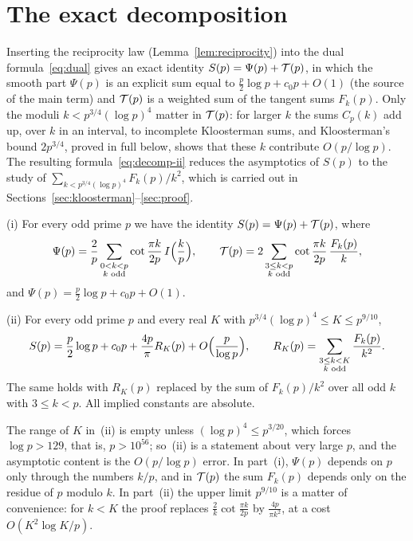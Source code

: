 \section{The exact decomposition}\label{sec:decomposition}

Inserting the reciprocity law (Lemma~\ref{lem:reciprocity}) into the dual formula~\eqref{eq:dual} gives an exact identity $S(p)=\Psi(p)+\mathcal{T}(p)$, in which the smooth part $\Psi(p)$ is an explicit sum equal to $\frac p2\log p+c_0p+O(1)$ (the source of the main term) and $\mathcal{T}(p)$ is a weighted sum of the tangent sums $F_k(p)$. Only the moduli $k<p^{3/4}(\log p)^4$ matter in $\mathcal{T}(p)$: for larger $k$ the sums $C_p(k)$ add up, over $k$ in an interval, to incomplete Kloosterman sums, and Kloosterman's bound $2p^{3/4}$, proved in full below, shows that these $k$ contribute $O(p/\log p)$. The resulting formula~\eqref{eq:decomp-ii} reduces the asymptotics of $S(p)$ to the study of $\sum_{k<p^{3/4}(\log p)^4}F_k(p)/k^2$, which is carried out in Sections~\ref{sec:kloosterman}--\ref{sec:proof}.

\begin{theorem}\label{thm:decomp}
\textup{(i)} For every odd prime $p$ we have the identity $S(p)=\Psi(p)+\mathcal{T}(p)$, where
\[
\Psi(p)=\frac2p\sum_{\substack{0<k<p\\ k\text{ odd}}}\cot\frac{\pi k}{2p}\,I\Bigl(\frac kp\Bigr),\qquad\mathcal{T}(p)=2\sum_{\substack{3\le k<p\\ k\text{ odd}}}\cot\frac{\pi k}{2p}\,\frac{F_k(p)}k,
\]
and $\Psi(p)=\frac p2\log p+c_0p+O(1)$.

\textup{(ii)} For every odd prime $p$ and every real $K$ with $p^{3/4}(\log p)^4\le K\le p^{9/10}$,
\begin{equation}\label{eq:decomp-ii}
S(p)=\frac p2\log p+c_0p+\frac{4p}\pi R_K(p)+O\Bigl(\frac p{\log p}\Bigr),\qquad R_K(p)=\sum_{\substack{3\le k<K\\ k\text{ odd}}}\frac{F_k(p)}{k^2}.
\end{equation}
The same holds with $R_K(p)$ replaced by the sum of $F_k(p)/k^2$ over all odd $k$ with $3\le k<p$. All implied constants are absolute.
\end{theorem}

The range of $K$ in~(ii) is empty unless $(\log p)^4\le p^{3/20}$, which forces $\log p>129$, that is, $p>10^{56}$; so~(ii) is a statement about very large $p$, and the asymptotic content is the $O(p/\log p)$ error. In part~(i), $\Psi(p)$ depends on $p$ only through the numbers $k/p$, and in $\mathcal{T}(p)$ the sum $F_k(p)$ depends only on the residue of $p$ modulo $k$. In part~(ii) the upper limit $p^{9/10}$ is a matter of convenience: for $k<K$ the proof replaces $\frac2k\cot\frac{\pi k}{2p}$ by $\frac{4p}{\pi k^2}$, at a cost $O(K^2\log K/p)$.

